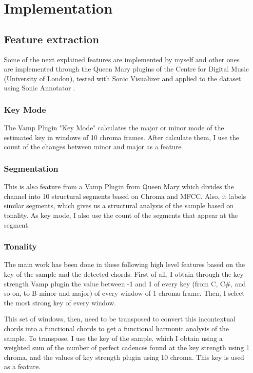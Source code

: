 \documentclass[a4paper,openany,oneside,12pt]{book}
\begin{document}
\chapter{Implementation}\label{used_techs}

\section{Feature extraction}\label{sec:feature_extraction}

Some of the next explained features are implemented by myself and other ones are implemented through the Queen Mary plugins of the Centre for Digital Music (University of London), tested with Sonic Visualizer \cite{SonicVisualiser} and applied to the dataset using Sonic Annotator \cite{chris2010a}.

\subsection{Key Mode}\label{subsec:keymode}

The Vamp Plugin "Key Mode" calculates the major or minor mode of the estimated key in windows of 10 chroma frames. After calculate them, I use the count of the changes between minor and major as a feature.

\subsection{Segmentation}\label{subsec:segmentation}

This is also feature from a Vamp Plugin from Queen Mary which divides the channel into 10 structural segments based on Chroma and MFCC. Also, it labels similar segments, which gives us a structural analysis of the sample based on tonality. As key mode, I also use the count of the segments that appear at the segment.

\subsection{Tonality}\label{subsec:chord_windows}

The main work has been done in these following high level features based on the key of the sample and the detected chords. First of all, I obtain through the key strength Vamp plugin the value between -1 and 1 of every key (from C, C\#, and so on, to B minor and major) of every window of 1 chroma frame. Then, I select the most strong key of every window.

This set of windows, then, need to be transposed to convert this incontextual chords into a functional chords to get a functional harmonic analysis of the sample. To transpose, I use the key of the sample, which I obtain using a weighted sum of the number of perfect cadences found at the key strength using 1 chroma, and the values of key strength plugin using 10 chroma. This key is used as a feature.
\end{document}
